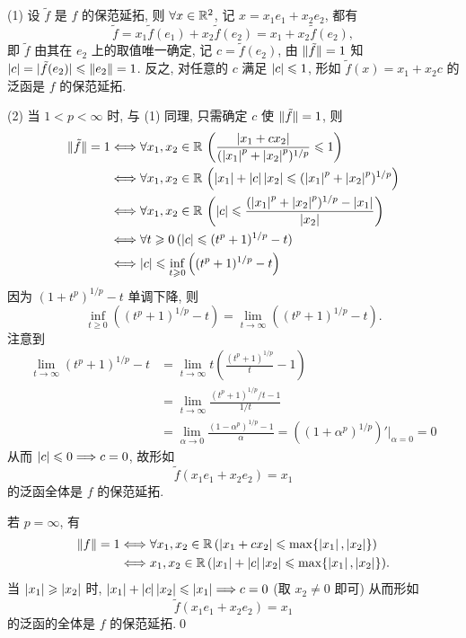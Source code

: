 	\begin{Proof}
		(1) 设 $ \tilde{f} $ 是 $ f $ 的保范延拓, 则 $ \forall x\in\mathbb{R}^{2} $, 记 $ x=x_{1}e_{1}+x_{2}e_{2} $, 都有
		\[
			\tilde{f} = x_{1}\tilde{f}(e_{1})+x_{2}\tilde{f}(e_{2})=x_{1}+x_{2}\tilde{f}(e_{2}),
		\]
		即 $ \tilde{f} $ 由其在 $ e_{2} $ 上的取值唯一确定, 记 $ c=\tilde{f}(e_{2}) $, 由 $ \lVert \tilde{f}\rVert=1 $ 知 $ \left| c \right| =\lvert \tilde{f}(e_{2})\rvert\leqslant\left\| e_{2} \right\|=1 $. 反之, 对任意的 $ c $ 满足 $ \left| c \right| \leqslant 1 $, 形如 $ \tilde{f}(x)=x_{1}+x_{2}c $ 的泛函是 $ f $ 的保范延拓.

		(2) 当 $ 1<p<\infty $ 时, 与 (1) 同理, 只需确定 $ c $ 使 $ \lVert \tilde{f}\rVert=1 $, 则
		\[
			\begin{aligned}
				\lVert \tilde{f}\rVert=1 & \Longleftrightarrow \forall x_{1}, x_{2}\in\mathbb{R}\,\left( \frac{\left| x_{1}+cx_{2} \right| }{(\left| x_{1} \right| ^{p}+\left| x_{2} \right| ^{p})^{1/p}}\leqslant1 \right)\\
				& \Longleftrightarrow\forall x_{1}, x_{2}\in\mathbb{R}\,\left(\left| x_{1} \right| +\left| c \right| \left| x_{2} \right| \leqslant(\left| x_{1} \right| ^{p}+\left| x_{2} \right| ^{p})^{1/p} \right)\\
				& \Longleftrightarrow \forall x_{1}, x_{2}\in\mathbb{R}\,\left( \left| c \right| \leqslant\frac{(\left| x_{1} \right| ^{p}+\left| x_{2} \right| ^{p})^{1/p}-\left| x_{1} \right| }{\left| x_{2} \right| } \right)\\
				& \Longleftrightarrow \forall t\geqslant0\,(\left| c \right| \leqslant(t^{p}+1)^{1/p}-t)\\
				&\Longleftrightarrow \left| c \right| \leqslant\inf_{t\geqslant0}\left( (t^{p}+1)^{1/p}-t \right)
			\end{aligned}
		\]
		因为 $ (1+t^{p})^{1/p}-t $ 单调下降, 则
		\[
			\inf_{t\geqslant0}\left( (t^{p}+1)^{1/p}-t \right)=\lim_{t\to\infty}\left( (t^{p}+1)^{1/p}-t \right).
		\]
		注意到
		\[
			\begin{aligned}
				\lim_{t\to\infty}(t^{p}+1)^{1/p}-t & =\lim_{t\to\infty}t\left( \frac{(t^{p}+1)^{1/p}}{t}-1 \right)\\
				& = \lim_{t\to\infty}\frac{(t^{p}+1)^{1/p}/t-1}{1/t}\\
				& = \lim_{\alpha\to0}\frac{(1-\alpha^{p})^{1/p}-1}{\alpha}=\left( (1+\alpha^{p})^{1/p} \right)'\Big|_{\alpha=0}=0
			\end{aligned}
		\]
		从而 $ \left| c \right| \leqslant0\Longrightarrow c=0 $, 故形如 
		\[
			\tilde{f}(x_{1}e_{1}+x_{2}e_{2})=x_{1}
		\]
		的泛函全体是 $ f $ 的保范延拓.

		若 $ p=\infty $, 有
		\[
			\begin{aligned}
				\lVert f\rVert=1& \Longleftrightarrow \forall x_{1}, x_{2}\in\mathbb{R}\,(\left| x_{1}+cx_{2} \right|  \leqslant\max\{ \left| x_{1} \right| , \left| x_{2} \right|  \})\\
				& \Longleftrightarrow x_{1}, x_{2}\in\mathbb{R}\,(\left| x_{1} \right| +\left| c \right| \left| x_{2} \right| \leqslant\max\{ \left| x_{1} \right| , \left| x_{2} \right|  \}).
			\end{aligned}	
		\]
		当 $ \left| x_{1} \right| \geqslant\left| x_{2} \right|  $ 时, $ \left| x_{1} \right| +\left| c \right| \left| x_{2} \right| \leqslant\left| x_{1} \right| \Longrightarrow c=0 $ (取 $ x_{2}\ne 0 $ 即可) 从而形如
		\[
			\tilde{f}(x_{1}e_{1}+x_{2}e_{2})=x_{1}
		\]
		的泛函的全体是 $ f $ 的保范延拓.\qed
	\end{Proof}

